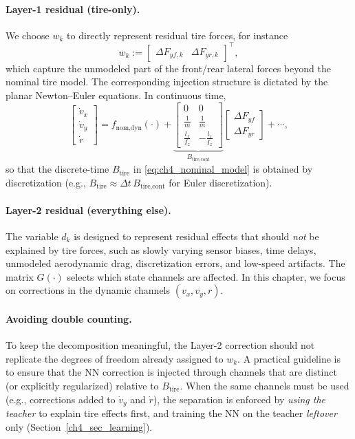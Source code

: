 \paragraph{Layer-1 residual (tire-only).}
We choose $w_k$ to directly represent residual tire forces, for instance
\begin{equation}\label{eq:ch4_wtire_def}
    w_k := \begin{bmatrix} \Delta F_{yf,k} & \Delta F_{yr,k} \end{bmatrix}^{\top},
\end{equation}
which capture the unmodeled part of the front/rear lateral forces beyond the nominal tire model. The corresponding injection structure is dictated by the planar Newton--Euler equations. In continuous time,
\begin{equation}\label{eq:ch4_btire_cont}
    \begin{bmatrix} \dot v_x \\ \dot v_y \\ \dot r \end{bmatrix}
    = f_{\text{nom,dyn}}(\cdot) +
    \underbrace{\begin{bmatrix}
        0 & 0 \\
        \tfrac{1}{m} & \tfrac{1}{m} \\
        \tfrac{l_f}{I_z} & -\tfrac{l_r}{I_z}
    \end{bmatrix}}_{B_{\text{tire,cont}}}
    \begin{bmatrix} \Delta F_{yf} \\ \Delta F_{yr} \end{bmatrix}
    + \cdots,
\end{equation}
so that the discrete-time $B_{\text{tire}}$ in \eqref{eq:ch4_nominal_model} is obtained by discretization (e.g., $B_{\text{tire}}\approx \Delta t\,B_{\text{tire,cont}}$ for Euler discretization).

\paragraph{Layer-2 residual (everything else).}
The variable $d_k$ is designed to represent residual effects that should \emph{not} be explained by tire forces, such as slowly varying sensor biases, time delays, unmodeled aerodynamic drag, discretization errors, and low-speed artifacts. The matrix $G(\cdot)$ selects which state channels are affected. In this chapter, we focus on corrections in the dynamic channels $(v_x,v_y,r)$.

\paragraph{Avoiding double counting.}
To keep the decomposition meaningful, the Layer-2 correction should not replicate the degrees of freedom already assigned to $w_k$. A practical guideline is to ensure that the NN correction is injected through channels that are distinct (or explicitly regularized) relative to $B_{\text{tire}}$. When the same channels must be used (e.g., corrections added to $\dot v_y$ and $\dot r$), the separation is enforced by \emph{using the teacher} to explain tire effects first, and training the NN on the teacher \emph{leftover} only (Section~\ref{ch4_sec_learning}).

